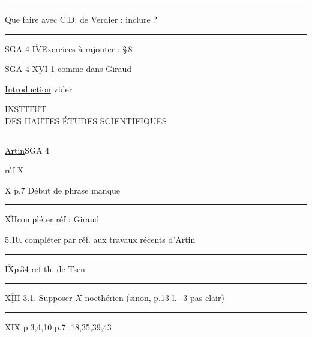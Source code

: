 \noindent\rule{\linewidth}{0.4pt}

Que faire avec C.D. de Verdier : inclure ?

\noindent\rule{\linewidth}{0.4pt}

SGA 4 $\underline{\overline{\mathrm{IV}}}$\qquad Exercices à rajouter : \S\,8

SGA 4 $\underline{\overline{\mathrm{XVI}}}$ \uline{1}\qquad {} comme dans Giraud

\uline{Introduction} vider

\begin{center}
INSTITUT\\
DES HAUTES ÉTUDES SCIENTIFIQUES\\
\rule{2.3em}{0.4pt}
\end{center}

\uline{Artin}\qquad SGA 4

réf \quad X \quad [1]

X \qquad p.7 \qquad Début de phrase manque

\noindent\rule{\linewidth}{0.4pt}

$\underline{\overline{\mathrm{XII}}}$\qquad compléter réf : Giraud

5.10. \qquad compléter  par réf. aux travaux récents d'Artin

\noindent\rule{.32\linewidth}{0.4pt}

$\underline{\overline{\mathrm{IX}}}$\qquad p\,34 \qquad ref th. de Tsen

\noindent\rule{.6\linewidth}{0.4pt}

$\underline{\overline{\mathrm{XIII}}}$\qquad {} 3.1. \qquad Supposer $X$ noethérien (sinon, p.13 l.$-3$ pas clair)

\noindent\rule{.42\linewidth}{0.4pt}

XIX \qquad p.3,4,10 \qquad p.7 ,18,35,39,43

